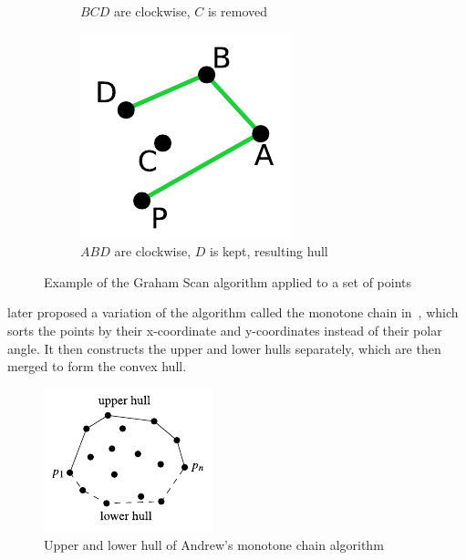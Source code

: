 \begin{figure}[h!]
\begin{subfigure}[b]{0.25\textwidth}
        \caption{$BCD$ are clockwise, $C$ is removed}
    \end{subfigure}%
    \hspace{0.05\textwidth} %
    \begin{subfigure}[b]{0.25\textwidth}
        \centering
        \includegraphics[width=0.9\linewidth]{images/graham3}
        \caption{$ABD$ are clockwise, $D$ is kept, resulting hull}
    \end{subfigure}%
    \caption{Example of the Graham Scan algorithm applied to a set of points}
    \label{fig:graham}
\end{figure}

\cite{andrew_another_1979} later proposed a variation of the algorithm called the
monotone chain in~\citeyear{andrew_another_1979}, which sorts the points by their
x-coordinate and y-coordinates instead of their polar angle.
It then constructs the upper and lower hulls separately, which are then merged to form the convex hull.


\begin{figure}[ht!]
    \centering
    \includegraphics[width=0.35\linewidth]{images/andrews}
    \caption{Upper and lower hull of Andrew's monotone chain algorithm}
\end{figure}


